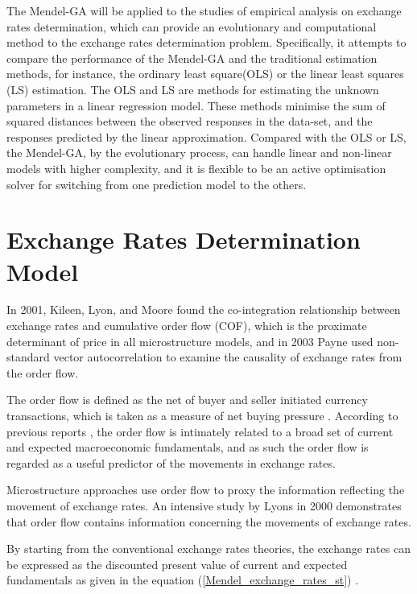The Mendel-GA will be applied to the studies of empirical
analysis on exchange rates determination, which can provide an
evolutionary and computational method to the exchange rates
determination problem. Specifically, it attempts to compare the
performance of the Mendel-GA and the traditional estimation methods, for
instance, the ordinary least square(OLS) or the linear least squares
(LS) estimation. The OLS and LS are methods for estimating the
unknown parameters in a linear regression model. These methods
minimise the sum of squared distances between the observed
responses in the data-set, and the responses predicted by the linear
approximation. Compared with the OLS or LS, the Mendel-GA, by the evolutionary process,
can handle linear and non-linear models with higher complexity, and it is flexible to be an active
optimisation solver for switching from one prediction model to the
others.

\section{Exchange Rates Determination Model}
\label{Exchange rates determination}


In 2001, Kileen, Lyon, and Moore \cite{Killeen2001} found the
co-integration relationship between exchange rates and cumulative
order flow (COF), which is the proximate determinant of price in all
microstructure models, and in 2003 Payne \cite{Payne2003} used
non-standard vector autocorrelation to examine the causality of
exchange rates from the order flow.

The order flow is defined as the net of buyer and seller initiated
currency transactions, which is taken as a measure of net
buying pressure \cite{Lyons2001}. According to previous reports
\cite{Obstfeld2000,Killeen2001,Payne2003,Reitz2007,Rime2008}, the order flow is intimately
related to a broad set of current and expected macroeconomic
fundamentals, and as such the order flow is regarded as a useful predictor
of the movements in exchange rates.

Microstructure approaches use order flow to proxy the information
reflecting the movement of exchange rates. An intensive study by Lyons
\cite{Obstfeld2000} in 2000 demonstrates that order flow contains
information concerning the movements of exchange rates.


By starting from the conventional exchange rates theories, the
exchange rates can be expressed as the discounted present value of
current and expected fundamentals as given in the equation
(\ref{Mendel_exchange_rates_st}) \cite{Obstfeld2000,Killeen2001,Payne2003,Rime2008,Andersen2003}.

